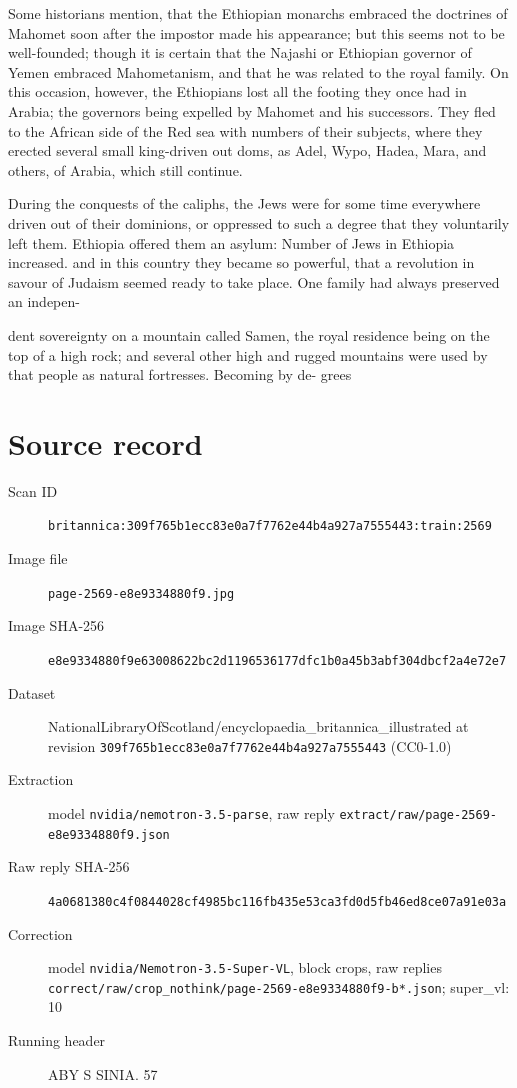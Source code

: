\documentclass{article}
\begin{document}
Some historians mention, that the Ethiopian monarchs embraced the doctrines of Mahomet soon after the impostor made his appearance; but this seems not to be well-founded; though it is certain that the Najashi or Ethiopian governor of Yemen embraced Mahometanism, and that he was related to the royal family. On this occasion, however, the Ethiopians lost all the footing they once had in Arabia; the governors being expelled by Mahomet and his successors. They fled to the African side of the Red sea with numbers of their subjects, where they erected several small king-driven out doms, as Adel, Wypo, Hadea, Mara, and others, of Arabia, which still continue.

During the conquests of the caliphs, the Jews were for some time everywhere driven out of their dominions, or oppressed to such a degree that they voluntarily left them. Ethiopia offered them an asylum: Number of Jews in Ethiopia increased. and in this country they became so powerful, that a revolution in savour of Judaism seemed ready to take place. One family had always preserved an indepen-

dent sovereignty on a mountain called Samen, the royal residence being on the top of a high rock; and several other high and rugged mountains were used by that people as natural fortresses. Becoming by de- grees


\section*{Source record}
\begin{description}
\item[Scan ID] \texttt{britannica:309f765b1ecc83e0a7f7762e44b4a927a7555443:train:2569}
\item[Image file] \texttt{page-2569-e8e9334880f9.jpg}
\item[Image SHA-256] \texttt{e8e9334880f9e63008622bc2d1196536177dfc1b0a45b3abf304dbcf2a4e72e7}
\item[Dataset] NationalLibraryOfScotland/encyclopaedia\_britannica\_illustrated at revision \texttt{309f765b1ecc83e0a7f7762e44b4a927a7555443} (CC0-1.0)
\item[Extraction] model \texttt{nvidia/nemotron-3.5-parse}, raw reply \texttt{extract/raw/page-2569-e8e9334880f9.json}
\item[Raw reply SHA-256] \texttt{4a0681380c4f0844028cf4985bc116fb435e53ca3fd0d5fb46ed8ce07a91e03a}
\item[Correction] model \texttt{nvidia/Nemotron-3.5-Super-VL}, block crops, raw replies \texttt{correct/raw/crop\_nothink/page-2569-e8e9334880f9-b*.json}; super\_vl: 10
\item[Running header] ABY S SINIA. 57
\end{description}
\end{document}
